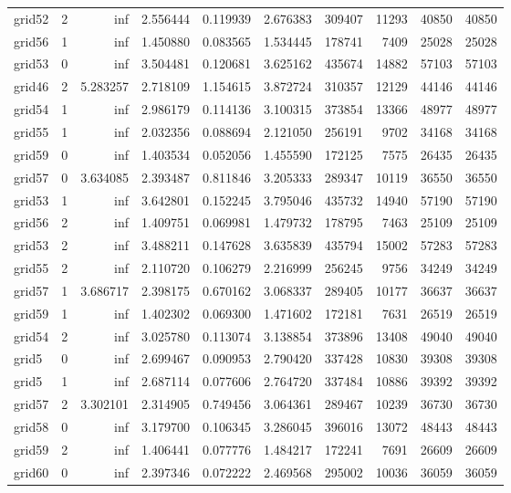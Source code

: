 \begin{longtable}{|l|r|r|r|r|r|r|r|r|r|}
grid52 & 2 & inf & 2.556444 & 0.119939 & 2.676383 & 309407 & 11293 & 40850 & 40850 \\
grid56 & 1 & inf & 1.450880 & 0.083565 & 1.534445 & 178741 & 7409 & 25028 & 25028 \\
grid53 & 0 & inf & 3.504481 & 0.120681 & 3.625162 & 435674 & 14882 & 57103 & 57103 \\
grid46 & 2 & 5.283257 & 2.718109 & 1.154615 & 3.872724 & 310357 & 12129 & 44146 & 44146 \\
grid54 & 1 & inf & 2.986179 & 0.114136 & 3.100315 & 373854 & 13366 & 48977 & 48977 \\
grid55 & 1 & inf & 2.032356 & 0.088694 & 2.121050 & 256191 & 9702 & 34168 & 34168 \\
grid59 & 0 & inf & 1.403534 & 0.052056 & 1.455590 & 172125 & 7575 & 26435 & 26435 \\
grid57 & 0 & 3.634085 & 2.393487 & 0.811846 & 3.205333 & 289347 & 10119 & 36550 & 36550 \\
grid53 & 1 & inf & 3.642801 & 0.152245 & 3.795046 & 435732 & 14940 & 57190 & 57190 \\
grid56 & 2 & inf & 1.409751 & 0.069981 & 1.479732 & 178795 & 7463 & 25109 & 25109 \\
grid53 & 2 & inf & 3.488211 & 0.147628 & 3.635839 & 435794 & 15002 & 57283 & 57283 \\
grid55 & 2 & inf & 2.110720 & 0.106279 & 2.216999 & 256245 & 9756 & 34249 & 34249 \\
grid57 & 1 & 3.686717 & 2.398175 & 0.670162 & 3.068337 & 289405 & 10177 & 36637 & 36637 \\
grid59 & 1 & inf & 1.402302 & 0.069300 & 1.471602 & 172181 & 7631 & 26519 & 26519 \\
grid54 & 2 & inf & 3.025780 & 0.113074 & 3.138854 & 373896 & 13408 & 49040 & 49040 \\
grid5 & 0 & inf & 2.699467 & 0.090953 & 2.790420 & 337428 & 10830 & 39308 & 39308 \\
grid5 & 1 & inf & 2.687114 & 0.077606 & 2.764720 & 337484 & 10886 & 39392 & 39392 \\
grid57 & 2 & 3.302101 & 2.314905 & 0.749456 & 3.064361 & 289467 & 10239 & 36730 & 36730 \\
grid58 & 0 & inf & 3.179700 & 0.106345 & 3.286045 & 396016 & 13072 & 48443 & 48443 \\
grid59 & 2 & inf & 1.406441 & 0.077776 & 1.484217 & 172241 & 7691 & 26609 & 26609 \\
grid60 & 0 & inf & 2.397346 & 0.072222 & 2.469568 & 295002 & 10036 & 36059 & 36059 \\

\end{longtable}
